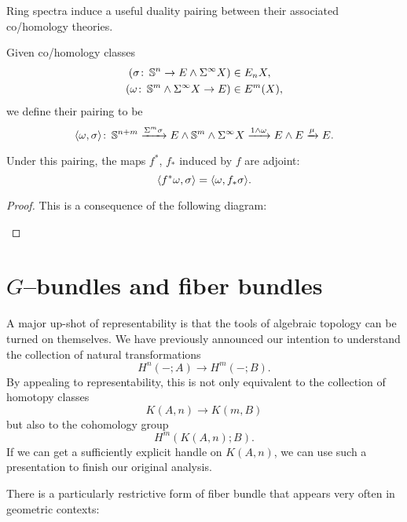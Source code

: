 Ring spectra induce a useful duality pairing between their associated co/homology theories.
\begin{definition}
Given co/homology classes
\begin{align*}
(\sigma\colon\thinspace \mathbb S^n \to E \wedge \Sigma^\infty X) & \in E_n X, \\
(\omega \colon\thinspace \mathbb S^m \wedge \Sigma^\infty X \to E) & \in E^m(X),
\end{align*}
we define their pairing to be \[\langle\omega, \sigma\rangle\colon\thinspace \mathbb S^{n+m} \xrightarrow{\Sigma^m \sigma} E \wedge \mathbb S^m \wedge \Sigma^\infty X \xrightarrow{1 \wedge \omega} E \wedge E \xrightarrow\mu E.\]
\end{definition}

\begin{lemma}
Under this pairing, the maps $f^*$, $f_*$ induced by $f$ are adjoint: \[\langle f^* \omega, \sigma\rangle = \langle\omega, f_* \sigma\rangle.\]
\end{lemma}
\begin{proof}
This is a consequence of the following diagram:
\begin{center}
\end{center}
\end{proof}




\section{$G$--bundles and fiber bundles}

A major up-shot of representability is that the tools of algebraic topology can be turned on themselves.
We have previously announced our intention to understand the collection of natural transformations \[H^n(-; A) \to H^m(-; B).\]
By appealing to representability, this is not only equivalent to the collection of homotopy classes \[K(A, n) \to K(m, B)\] but also to the cohomology group \[H^m(K(A, n); B).\]
If we can get a sufficiently explicit handle on $K(A, n)$, we can use such a presentation to finish our original analysis.

There is a particularly restrictive form of fiber bundle that appears very often in geometric contexts:

